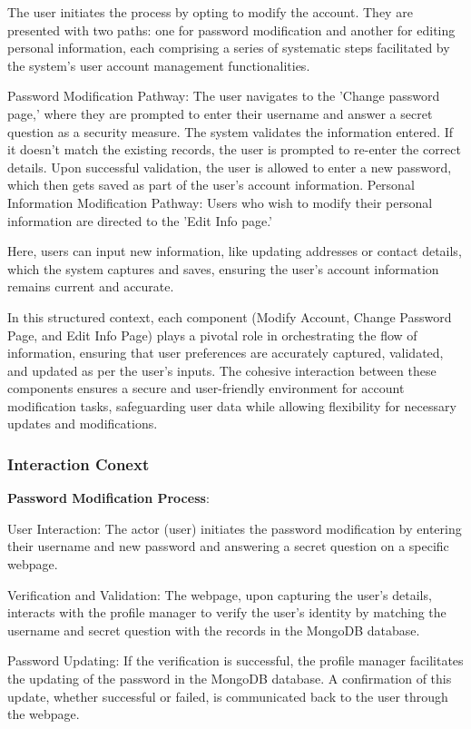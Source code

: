 \documentclass[conference]{IEEEtran}
\begin{document}
The user initiates the process by opting to modify the account. They are presented with two paths: one for password modification and another for editing personal information, each comprising a series of systematic steps facilitated by the system's user account management functionalities.

Password Modification Pathway:
The user navigates to the 'Change password page,' where they are prompted to enter their username and answer a secret question as a security measure.
The system validates the information entered. If it doesn't match the existing records, the user is prompted to re-enter the correct details.
Upon successful validation, the user is allowed to enter a new password, which then gets saved as part of the user's account information.
Personal Information Modification Pathway:
Users who wish to modify their personal information are directed to the 'Edit Info page.'

Here, users can input new information, like updating addresses or contact details, which the system captures and saves, ensuring the user's account information remains current and accurate.

In this structured context, each component (Modify Account, Change Password Page, and Edit Info Page) plays a pivotal role in orchestrating the flow of information, ensuring that user preferences are accurately captured, validated, and updated as per the user's inputs. The cohesive interaction between these components ensures a secure and user-friendly environment for account modification tasks, safeguarding user data while allowing flexibility for necessary updates and modifications.


\subsubsection{\textbf{Interaction Conext }}
\textbf{ }

\textbf{ Password Modification Process}:

User Interaction: The actor (user) initiates the password modification by entering their username and new password and answering a secret question on a specific webpage.

Verification and Validation: The webpage, upon capturing the user's details, interacts with the profile manager to verify the user's identity by matching the username and secret question with the records in the MongoDB database.

Password Updating: If the verification is successful, the profile manager facilitates the updating of the password in the MongoDB database. A confirmation of this update, whether successful or failed, is communicated back to the user through the webpage.
\end{document}
